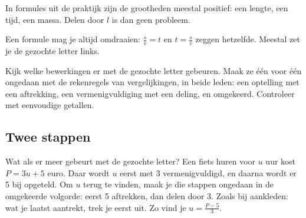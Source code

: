 In formules uit de praktijk zijn de grootheden meestal positief: een lengte, een tijd, een massa. Delen door $l$ is dan geen probleem.


Een formule mag je altijd omdraaien: $\tfrac sv = t$ en $t = \tfrac sv$ zeggen hetzelfde. Meestal zet je de gezochte letter links.


\begin{werkwijze}
Kijk welke bewerkingen er met de gezochte letter gebeuren. Maak ze één voor één ongedaan met de rekenregels van vergelijkingen, in beide leden: een optelling met een aftrekking, een vermenigvuldiging met een deling, en omgekeerd. Controleer met eenvoudige getallen.
\end{werkwijze}


\begin{oefeningen}
\end{oefeningen}

\subsection{Twee stappen}

Wat als er meer gebeurt met de gezochte letter? Een fiets huren voor $u$ uur kost $P = 3u + 5$ euro. Daar wordt $u$ eerst met 3 vermenigvuldigd, en daarna wordt er 5 bij opgeteld. Om $u$ terug te vinden, maak je die stappen ongedaan in de omgekeerde volgorde: eerst 5 aftrekken, dan delen door 3. Zoals bij aankleden: wat je laatst aantrekt, trek je eerst uit. Zo vind je $u = \tfrac{P - 5}{3}$.

